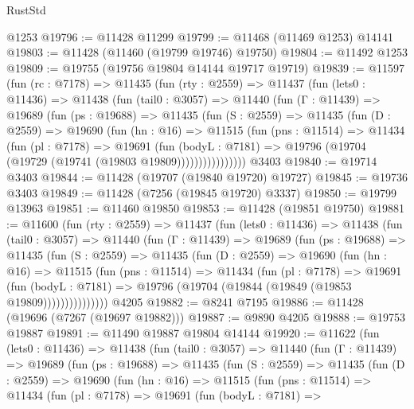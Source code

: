 \begin{lexlean}{RustStd}
\begin{coremodule}
    @1253
@19796 := @11428 @11299
@19799 := @11468 (@11469 @1253) @14141
@19803 := @11428 (@11460 (@19799 @19746) @19750)
@19804 := @11492 @1253
@19809 := @19755 (@19756 @19804 @14144 @19717 @19719)
@19839 := @11597
    (fun (rc : @7178) =>
    @11435
      (fun (rty : @2559) =>
      @11437
        (fun (lets0 : @11436) =>
        @11438
          (fun (tail0 : @3057) =>
          @11440
            (fun (Γ : @11439) =>
            @19689
              (fun (ps : @19688) =>
              @11435
                (fun (S : @2559) =>
                @11435
                  (fun (D : @2559) =>
                  @19690
                    (fun (hn : @16) =>
                    @11515
                      (fun (pns : @11514) =>
                      @11434
                        (fun (pl : @7178) =>
                        @19691
                          (fun (bodyL : @7181) =>
                          @19796 (@19704 (@19729 (@19741 (@19803 @19809))))))))))))))))
    @3403
@19840 := @19714 @3403
@19844 := @11428 (@19707 (@19840 @19720) @19727)
@19845 := @19736 @3403
@19849 := @11428 (@7256 (@19845 @19720) @3337)
@19850 := @19799 @13963
@19851 := @11460 @19850
@19853 := @11428 (@19851 @19750)
@19881 := @11600
    (fun (rty : @2559) =>
    @11437
      (fun (lets0 : @11436) =>
      @11438
        (fun (tail0 : @3057) =>
        @11440
          (fun (Γ : @11439) =>
          @19689
            (fun (ps : @19688) =>
            @11435
              (fun (S : @2559) =>
              @11435
                (fun (D : @2559) =>
                @19690
                  (fun (hn : @16) =>
                  @11515
                    (fun (pns : @11514) =>
                    @11434
                      (fun (pl : @7178) =>
                      @19691
                        (fun (bodyL : @7181) =>
                        @19796 (@19704 (@19844 (@19849 (@19853 @19809)))))))))))))))
    @4205
@19882 := @8241 @7195
@19886 := @11428 (@19696 (@7267 (@19697 @19882)))
@19887 := @9890 @4205
@19888 := @19753 @19887
@19891 := @11490 @19887 @19804 @14144
@19920 := @11622
    (fun (lets0 : @11436) =>
    @11438
      (fun (tail0 : @3057) =>
      @11440
        (fun (Γ : @11439) =>
        @19689
          (fun (ps : @19688) =>
          @11435
            (fun (S : @2559) =>
            @11435
              (fun (D : @2559) =>
              @19690
                (fun (hn : @16) =>
                @11515
                  (fun (pns : @11514) =>
                  @11434
                    (fun (pl : @7178) =>
                    @19691
                      (fun (bodyL : @7181) =>

\end{coremodule}
\end{lexlean}
